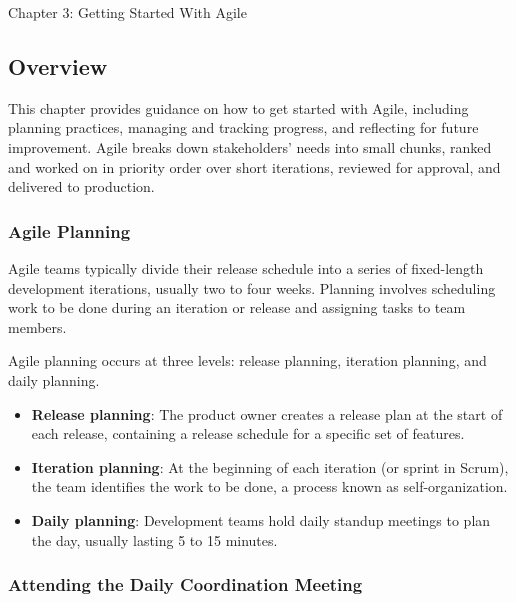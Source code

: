 \begin{notes}{Chapter 3: Getting Started With Agile}
    \subsection*{Overview}

    This chapter provides guidance on how to get started with Agile, including planning practices, managing and tracking progress, and reflecting for future improvement. Agile breaks down stakeholders' 
    needs into small chunks, ranked and worked on in priority order over short iterations, reviewed for approval, and delivered to production.
    
    \subsubsection*{Agile Planning}
    
    Agile teams typically divide their release schedule into a series of fixed-length development iterations, usually two to four weeks. Planning involves scheduling work to be done during an iteration 
    or release and assigning tasks to team members.
    
    \begin{highlight}
    
        Agile planning occurs at three levels: release planning, iteration planning, and daily planning.
        
        \begin{itemize}
            \item \textbf{Release planning}: The product owner creates a release plan at the start of each release, containing a release schedule for a specific set of features.
            \item \textbf{Iteration planning}: At the beginning of each iteration (or sprint in Scrum), the team identifies the work to be done, a process known as self-organization.
            \item \textbf{Daily planning}: Development teams hold daily standup meetings to plan the day, usually lasting 5 to 15 minutes.
        \end{itemize}
    
    \end{highlight}
    
    \subsubsection*{Attending the Daily Coordination Meeting}
    

\end{notes}
